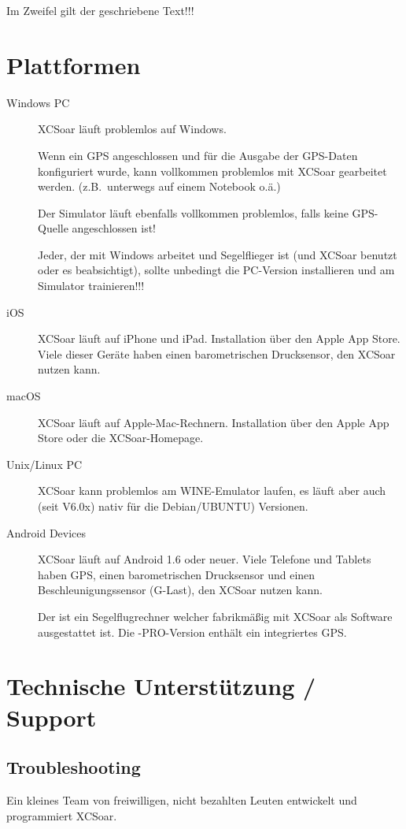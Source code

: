 Im Zweifel gilt der geschriebene Text!!!

\section{Plattformen}
\begin{description}
\item[Windows PC]
\textsf{XCSoar} läuft problemlos auf Windows.

Wenn ein GPS angeschlossen und für die Ausgabe der GPS-Daten konfiguriert wurde, kann vollkommen problemlos mit \textsf{XCSoar} gearbeitet 
werden.  (z.B.\ unterwegs auf einem Notebook o.ä.)

Der Simulator läuft ebenfalls vollkommen problemlos, falls keine GPS-Quelle angeschlossen ist!

Jeder, der mit Windows arbeitet und Segelflieger ist (und \textsf{XCSoar} benutzt oder es beabsichtigt), sollte unbedingt die 
PC-Version installieren und am Simulator trainieren!!! 
\item[iOS]
\textsf{XCSoar} läuft auf iPhone und iPad. Installation über den Apple App Store.
Viele dieser Geräte haben einen barometrischen Drucksensor, den \textsf{XCSoar} nutzen kann.
\item[macOS]
\textsf{XCSoar} läuft auf Apple-Mac-Rechnern. Installation über den Apple App Store
oder die XCSoar-Homepage.
\item[Unix/Linux PC]
\textsf{XCSoar} kann problemlos am WINE-Emulator laufen, es läuft aber auch (seit V6.0x) nativ für die Debian/UBUNTU) Versionen.
\item[Android Devices] \textsf{XCSoar} läuft auf Android 1.6 oder neuer.
Viele Telefone und Tablets haben GPS, einen barometrischen Drucksensor und einen Beschleunigungssensor (G-Last), den \textsf{XCSoar} nutzen kann. 
\item[\al] Der \al ist ein Segelflugrechner welcher fabrikmäßig mit \textsf{XCSoar} als Software ausgestattet ist. 
Die \al-PRO-Version enthält ein integriertes GPS.
\end{description}


\section{Technische Unterstützung / Support}

\subsection*{Troubleshooting}
Ein kleines Team von freiwilligen, nicht bezahlten Leuten entwickelt und programmiert \textsf{XCSoar}. 

